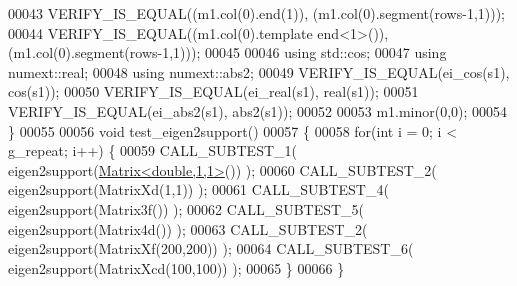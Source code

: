 \begin{DoxyCode}
00043   VERIFY\_IS\_EQUAL((m1.col(0).end(1)), (m1.col(0).segment(rows-1,1)));
00044   VERIFY\_IS\_EQUAL((m1.col(0).template end<1>()), (m1.col(0).segment(rows-1,1)));
00045   
00046   \textcolor{keyword}{using} std::cos;
00047   \textcolor{keyword}{using} numext::real;
00048   \textcolor{keyword}{using} numext::abs2;
00049   VERIFY\_IS\_EQUAL(ei\_cos(s1), cos(s1));
00050   VERIFY\_IS\_EQUAL(ei\_real(s1), real(s1));
00051   VERIFY\_IS\_EQUAL(ei\_abs2(s1), abs2(s1));
00052 
00053   m1.minor(0,0);
00054 \}
00055 
00056 \textcolor{keywordtype}{void} test\_eigen2support()
00057 \{
00058   \textcolor{keywordflow}{for}(\textcolor{keywordtype}{int} i = 0; i < g\_repeat; i++) \{
00059     CALL\_SUBTEST\_1( eigen2support(\hyperlink{group___core___module_class_eigen_1_1_matrix}{Matrix<double,1,1>}()) );
00060     CALL\_SUBTEST\_2( eigen2support(MatrixXd(1,1)) );
00061     CALL\_SUBTEST\_4( eigen2support(Matrix3f()) );
00062     CALL\_SUBTEST\_5( eigen2support(Matrix4d()) );
00063     CALL\_SUBTEST\_2( eigen2support(MatrixXf(200,200)) );
00064     CALL\_SUBTEST\_6( eigen2support(MatrixXcd(100,100)) );
00065   \}
00066 \}
\end{DoxyCode}
